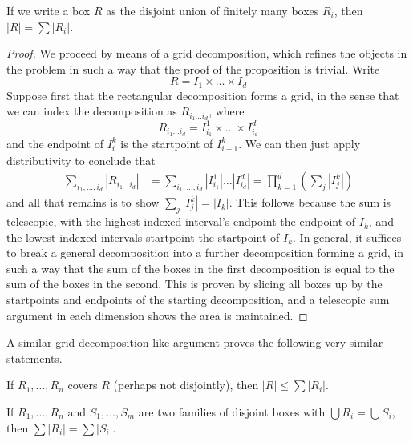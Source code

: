 \begin{lemma}
    If we write a box $R$ as the disjoint union of finitely many boxes $R_i$, then $|R| = \sum |R_i|$.
\end{lemma}
\begin{proof}
    We proceed by means of a grid decomposition, which refines the objects in the problem in such a way that the proof of the proposition is trivial. Write
    \[ R = I_1 \times \dots \times I_d \]
    Suppose first that the rectangular decomposition forms a grid, in the sense that we can index the decomposition as $R_{i_1 \dots i_d}$, where
    \[ R_{i_1 \dots i_d} = I^1_{i_1} \times \dots \times I^d_{i_d} \]
    and the endpoint of $I^k_i$ is the startpoint of $I^k_{i+1}$. We can then just apply distributivity to conclude that
    \begin{align*}
        \sum_{i_1, \dots, i_d} |R_{i_1 \dots i_d}| &= \sum_{i_1, \dots, i_d} |I^1_{i_1}| \dots |I^d_{i_d}| = \prod_{k = 1}^d \left( \sum_j |I^k_j| \right)
    \end{align*}
    and all that remains is to show $\sum_j |I^k_j| = |I_k|$. This follows because the sum is telescopic, with the highest indexed interval's endpoint the endpoint of $I_k$, and the lowest indexed intervals startpoint the startpoint of $I_k$. In general, it suffices to break a general decomposition into a further decomposition forming a grid, in such a way that the sum of the boxes in the first decomposition is equal to the sum of the boxes in the second. This is proven by slicing all boxes up by the startpoints and endpoints of the starting decomposition, and a telescopic sum argument in each dimension shows the area is maintained.
\end{proof}

A similar grid decomposition like argument proves the following very similar statements.

\begin{lemma}
    If $R_1, \dots, R_n$ covers $R$ (perhaps not disjointly), then $|R| \leq \sum |R_i|$.
\end{lemma}

\begin{lemma}
    If $R_1, \dots, R_n$ and $S_1, \dots, S_m$ are two families of disjoint boxes with $\bigcup R_i = \bigcup S_i$, then $\sum |R_i| = \sum |S_i|$.
\end{lemma}

